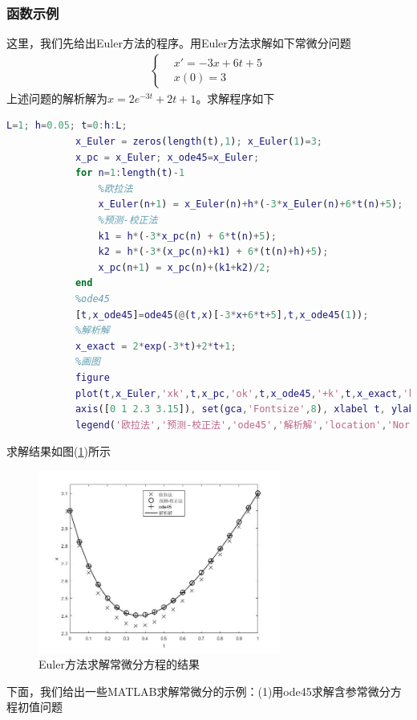 		\subsubsection{函数示例}
			\par
			这里，我们先给出Euler方法的程序。用Euler方法求解如下常微分问题
			\begin{align*}
			\left\{
			\begin{aligned}
			& x'= -3x+6t+5\\
			& x(0) = 3
			\end{aligned}
			\right.
			\end{align*}
			上述问题的解析解为$x = 2e^{-3t}+2t+1$。求解程序如下
			\begin{lstlisting}[language = Matlab]
			L=1; h=0.05; t=0:h:L;
			x_Euler = zeros(length(t),1); x_Euler(1)=3;
			x_pc = x_Euler; x_ode45=x_Euler;
			for n=1:length(t)-1
			    %欧拉法
			    x_Euler(n+1) = x_Euler(n)+h*(-3*x_Euler(n)+6*t(n)+5);
			    %预测-校正法
			    k1 = h*(-3*x_pc(n) + 6*t(n)+5);
			    k2 = h*(-3*(x_pc(n)+k1) + 6*(t(n)+h)+5);
			    x_pc(n+1) = x_pc(n)+(k1+k2)/2;
			end
			%ode45
			[t,x_ode45]=ode45(@(t,x)[-3*x+6*t+5],t,x_ode45(1));
			%解析解
			x_exact = 2*exp(-3*t)+2*t+1;
			%画图
			figure
			plot(t,x_Euler,'xk',t,x_pc,'ok',t,x_ode45,'+k',t,x_exact,'k','MarkerSize',8,'LineWidth',1)
			axis([0 1 2.3 3.15]), set(gca,'Fontsize',8), xlabel t, ylabel x
			legend('欧拉法','预测-校正法','ode45','解析解','location','North')
			\end{lstlisting}
			求解结果如图(\ref{fig:Euler-ode模拟结果})所示
			\begin{figure}[H]
	        \centering
	        \includegraphics[width=8cm]{images/Euler-ode.jpg}
	        \caption{Euler方法求解常微分方程的结果}
	        \label{fig:Euler-ode模拟结果}
	        \end{figure}
	        \par
	        下面，我们给出一些MATLAB求解常微分的示例：(1)用ode45求解含参常微分方程初值问题
